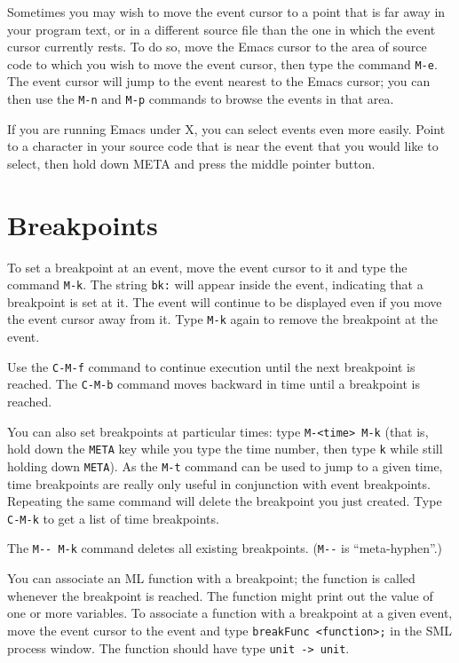 Sometimes you may wish to move the event cursor to a point that is far
away in your program text, or in a different source file than the one
in which the event cursor currently rests.  To do so, move the Emacs
cursor to the area of source code to which you wish to move the
event cursor, then
type the command \verb'M-e'.  The event cursor will jump to the event nearest
to the Emacs cursor; you can then use the \verb'M-n' and
\verb'M-p' commands to
browse the events in that area.

If you are running Emacs under X, you can select events even more
easily.  Point to a character in your source code that is near the
event that you would like to select, then hold down META and press the
middle pointer button.

\section{Breakpoints}

To set a breakpoint at an event, move the event cursor to it and type
the command \verb'M-k'.  The string \verb'bk:' will appear inside the event,
indicating that a breakpoint is set at it.  The event will continue to
be displayed even if you move the event cursor away from it.  Type \verb'M-k'
again to remove the breakpoint at the event.

Use the \verb'C-M-f' command to continue execution until the next breakpoint
is reached.  The \verb'C-M-b' command moves backward in time until a
breakpoint is reached.

You can also set breakpoints at particular times: type
\verb'M-<time> M-k'
(that is, hold down the \verb'META' key while you type
the time number, then type \verb'k' while still holding down \verb'META').
As the \verb'M-t' command can be used to jump to a given time, time
breakpoints are really only useful in conjunction with event
breakpoints.  Repeating the same command will delete the breakpoint
you just created.  Type \verb'C-M-k' to get a list of time breakpoints.

The \verb'M-- M-k' command deletes all existing breakpoints.
(\verb'M--' is ``meta-hyphen''.)

You can associate an ML function with a breakpoint; the function is
called whenever the breakpoint is reached.  The function might print
out the value of one or more variables.  To associate a function with
a breakpoint at a given event, move the event cursor to the event and
type \verb'breakFunc <function>;' in the SML process window.  The
function should have type \verb'unit -> unit'.

